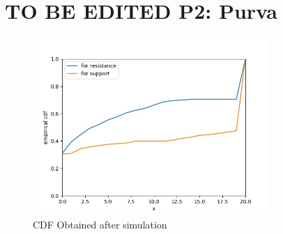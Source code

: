 \documentclass[letterpaper, 12pt] {article}
\begin{document}
	\pagebreak
	
	\section{TO BE EDITED P2: Purva}
	
		\begin{figure}[h!]
			\centering
			\includegraphics[width=0.8\textwidth]{emp_cdf_apple_c}
			\caption{CDF Obtained after simulation}
			\label{Figure 5}
		\end{figure}
		
	
	\pagebreak
\end{document}
